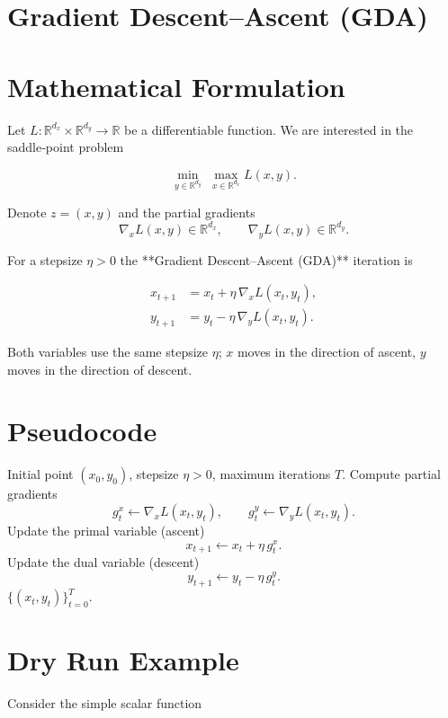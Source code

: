 \documentclass{article}
\begin{document}
\section*{Gradient Descent--Ascent (GDA)}

\section*{Mathematical Formulation}
Let $L:\mathbb{R}^{d_x}\times\mathbb{R}^{d_y}\rightarrow\mathbb{R}$ be a differentiable function.
We are interested in the saddle‑point problem  

\[
\min_{y\in\mathbb{R}^{d_y}}\;\max_{x\in\mathbb{R}^{d_x}} L(x,y).
\]

Denote $z=(x,y)$ and the partial gradients
\[
\nabla_x L(x,y)\in\mathbb{R}^{d_x},\qquad 
\nabla_y L(x,y)\in\mathbb{R}^{d_y}.
\]

For a stepsize $\eta>0$ the **Gradient Descent–Ascent (GDA)** iteration is  

\[
\boxed{
\begin{aligned}
x_{t+1} &= x_{t} + \eta \,\nabla_x L(x_t,y_t) ,\\[2mm]
y_{t+1} &= y_{t} - \eta \,\nabla_y L(x_t,y_t) .
\end{aligned}}
\tag{1}
\]

Both variables use the same stepsize $\eta$; $x$ moves in the direction of ascent,
$y$ moves in the direction of descent.

\section*{Pseudocode}
\begin{algorithm}[H]
\caption{Gradient Descent–Ascent (GDA)}\label{alg:GDA}
\begin{algorithmic}[1]
\Require Initial point $(x_0,y_0)$, stepsize $\eta>0$, maximum iterations $T$.
    \State Compute partial gradients 
    \[
    g^x_t \gets \nabla_x L(x_t,y_t),\qquad 
    g^y_t \gets \nabla_y L(x_t,y_t).
    \]
    \State Update the primal variable (ascent)  
    \[
    x_{t+1} \gets x_t + \eta\, g^x_t .
    \]
    \State Update the dual variable (descent)  
    \[
    y_{t+1} \gets y_t - \eta\, g^y_t .
    \]
\EndFor
\State \Return $\{(x_t,y_t)\}_{t=0}^{T}$.
\end{algorithmic}
\end{algorithm}

\section*{Dry Run Example}
Consider the simple scalar function  
\end{document}
